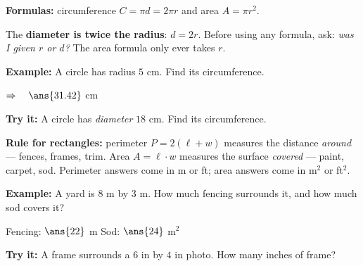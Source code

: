 \documentclass[12pt]{article}
\begin{document}


\begin{formulabox}
\textbf{Formulas:} circumference $C = \pi d = 2\pi r$ \quad and \quad area
$A = \pi r^2$.\par
The \textbf{diameter is twice the radius}: $d = 2r$. Before using any formula,
ask: \emph{was I given $r$ or $d$?} The area formula only ever takes $r$.
\end{formulabox}

\begin{examplebox}
\textbf{Example:} \quad A circle has radius $5$ cm. Find its circumference.

$\Rightarrow\quad \ans{31.42}$ cm
\end{examplebox}

\begin{tryitbox}
\textbf{Try it:} \quad A circle has \emph{diameter} $18$ cm. Find its
circumference.\\[2pt]
\end{tryitbox}


\begin{formulabox}
\textbf{Rule for rectangles:} perimeter $P = 2(\ell + w)$ measures the distance
\emph{around} --- fences, frames, trim. Area $A = \ell \cdot w$ measures the
surface \emph{covered} --- paint, carpet, sod. Perimeter answers come in m or
ft; area answers come in m$^2$ or ft$^2$.
\end{formulabox}

\begin{examplebox}
\textbf{Example:} \quad A yard is $8$ m by $3$ m. How much fencing surrounds
it, and how much sod covers it?

Fencing: $\ans{22}$ m \quad Sod: $\ans{24}$ m$^2$
\end{examplebox}

\begin{tryitbox}
\textbf{Try it:} \quad A frame surrounds a $6$ in by $4$ in photo. How many
inches of frame?\\[2pt]
\end{tryitbox}
\end{document}

